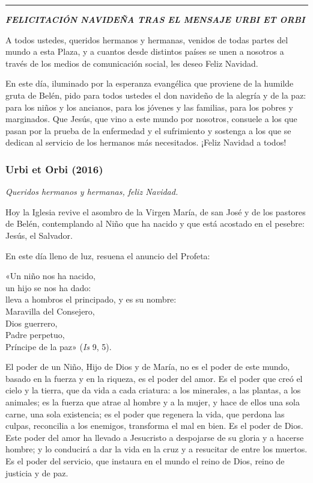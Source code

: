 \begin{center}\rule{0.5\linewidth}{\linethickness}\end{center}

\textbf{\emph{FELICITACIÓN NAVIDEÑA TRAS EL MENSAJE URBI ET ORBI}}

A todos ustedes, queridos hermanos y hermanas, venidos de todas partes
del mundo a esta Plaza, y a cuantos desde distintos países se unen a
nosotros a través de los medios de comunicación social, les deseo Feliz
Navidad.

En este día, iluminado por la esperanza evangélica que proviene de la
humilde gruta de Belén, pido para todos ustedes el don navideño de la
alegría y de la paz: para los niños y los ancianos, para los jóvenes y
las familias, para los pobres y marginados. Que Jesús, que vino a este
mundo por nosotros, consuele a los que pasan por la prueba de la
enfermedad y el sufrimiento y sostenga a los que se dedican al servicio
de los hermanos más necesitados. ¡Feliz Navidad a todos!

\subsubsection{Urbi et Orbi (2016)}

\emph{Queridos hermanos y hermanas, feliz Navidad.}

Hoy la Iglesia revive el asombro de la Virgen María, de san José y de
los pastores de Belén, contemplando al Niño que ha nacido y que está
acostado en el pesebre: Jesús, el Salvador.

En este día lleno de luz, resuena el anuncio del Profeta:

«Un niño nos ha nacido,\\
un hijo se nos ha dado:\\
lleva a hombros el principado, y es su nombre:\\
Maravilla del Consejero,\\
Dios guerrero,\\
Padre perpetuo,\\
Príncipe de la paz» (\emph{Is} 9, 5).

El poder de un Niño, Hijo de Dios y de María, no es el poder de este
mundo, basado en la fuerza y en la riqueza, es el poder del amor. Es el
poder que creó el cielo y la tierra, que da vida a cada criatura: a los
minerales, a las plantas, a los animales; es la fuerza que atrae al
hombre y a la mujer, y hace de ellos una sola carne, una sola
existencia; es el poder que regenera la vida, que perdona las culpas,
reconcilia a los enemigos, transforma el mal en bien. Es el poder de
Dios. Este poder del amor ha llevado a Jesucristo a despojarse de su
gloria y a hacerse hombre; y lo conducirá a dar la vida en la cruz y a
resucitar de entre los muertos. Es el poder del servicio, que instaura
en el mundo el reino de Dios, reino de justicia y de paz.

